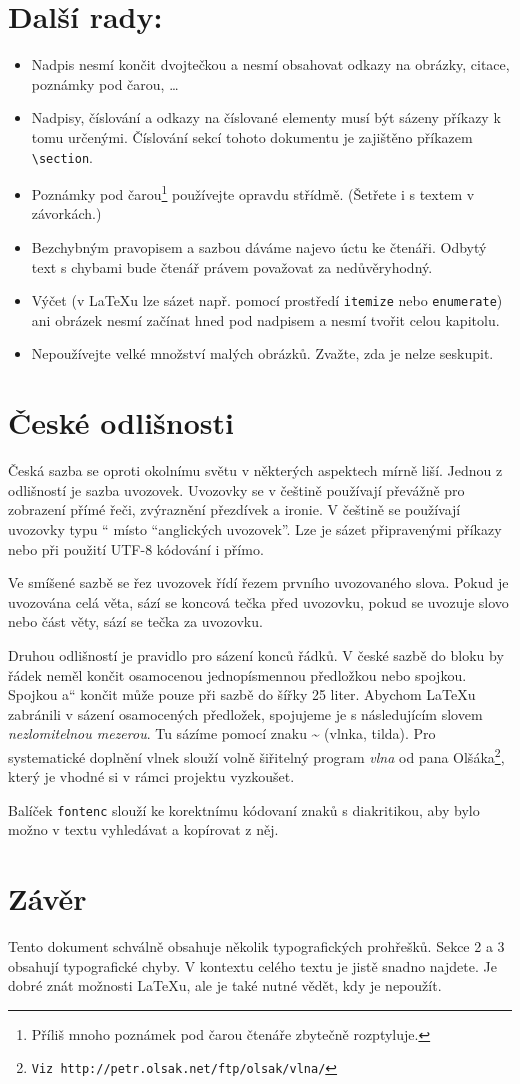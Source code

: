 \documentclass[10pt,a4paper,twocolumn]{article}
\newcommand{\myuv}[1]{\quotedblbase #1\textquotedblleft}
\begin{document}
\section{Další rady:}
\begin{itemize}
    \item Nadpis nesmí končit dvojtečkou a nesmí obsahovat odkazy na obrázky, citace, poznámky pod čarou, \dots
    \item Nadpisy, číslování a odkazy na číslované elementy musí být sázeny příkazy k tomu určenými. Číslování sekcí tohoto dokumentu je zajištěno příkazem \texttt{\textbackslash section}.
    \item Poznámky pod čarou\footnote{Příliš mnoho poznámek pod čarou čtenáře zbytečně rozptyluje.} používejte opravdu střídmě. (Šetřete i s textem v závorkách.)
    \item Bezchybným pravopisem a sazbou dáváme najevo úctu ke čtenáři. Odbytý text s chybami bude čtenář právem považovat za nedůvěryhodný.
    \item Výčet (v \LaTeX u lze sázet např. pomocí prostředí \texttt{itemize} nebo \texttt{enumerate}) ani obrázek nesmí začínat hned pod nadpisem a nesmí tvořit celou kapitolu.
    \item Nepoužívejte velké množství malých obrázků. Zvažte, zda je nelze seskupit.
\end{itemize}

\section{České odlišnosti}
Česká sazba se oproti okolnímu světu v některých aspektech mírně liší.
Jednou z odlišností je sazba uvozovek.
Uvozovky se v češtině používají převážně pro zobrazení přímé řeči, zvýraznění přezdívek a ironie.
V češtině se používají uvozovky typu \myuv{9966} místo ``anglických uvozovek''.
Lze je sázet připravenými příkazy nebo při použití UTF-8 kódování i přímo.
\par
Ve smíšené sazbě se řez uvozovek řídí řezem prvního uvozovaného slova.
Pokud je uvozována celá věta, sází se koncová tečka před uvozovku, pokud se uvozuje slovo nebo část věty, sází se tečka za uvozovku.
\par
Druhou odlišností je pravidlo pro sázení konců řádků.
V české sazbě do bloku by řádek neměl končit osamocenou jednopísmennou předložkou nebo spojkou.
Spojkou \myuv{a} končit může pouze při sazbě do šířky 25 liter.
Abychom \LaTeX u zabránili v sázení osamocených předložek, spojujeme je s následujícím slovem \emph{nezlomitelnou mezerou}.
Tu sázíme pomocí znaku {\bfseries \~{}} (vlnka, tilda).
Pro systematické doplnění vlnek slouží volně šiřitelný program \emph{vlna} od pana Olšáka\footnote{\texttt{Viz http://petr.olsak.net/ftp/olsak/vlna/}}, který je vhodné si v rámci projektu vyzkoušet.
\par
Balíček \texttt{fontenc} slouží ke korektnímu kódovaní znaků s diakritikou, aby bylo možno v textu vyhledávat a kopírovat z něj.

\section{Závěr}
Tento dokument schválně obsahuje několik typografických prohřešků.
Sekce 2 a 3 obsahují typografické chyby.
V kontextu celého textu je jistě snadno najdete.
Je dobré znát možnosti \LaTeX u, ale je také nutné vědět, kdy je nepoužít.
\end{document}
